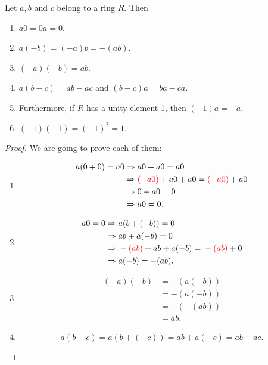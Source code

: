 \begin{theorem}
    Let $a,b$ and $c$ belong to a ring $R$. Then 
    \begin{enumerate}
        \item $a0 = 0a = 0$.
        \item $a(-b) = (-a)b = -(ab)$.
        \item $(-a)(-b) = ab$.
        \item $a(b-c) = ab - ac$ and $(b-c)a = ba-ca$.
        \item Furthermore, if $R$ has a unity element 1, then $(-1)a = -a$.
        \item $(-1)(-1) = (-1)^2 = 1$.
    \end{enumerate}
\end{theorem}
\begin{proof}
    We are going to prove each of them:

    \begin{enumerate}
        \item \begin{align*}
            a(0 + 0) = a0 &\Rightarrow a0 + a0 = a0\\
            &\Rightarrow {\color{red}{} (-a0)} + a0 + a0 = {\color{red}{} (-a0)} + a0\\
            &\Rightarrow 0 + a0 = 0\\
            &\Rightarrow a0 = 0.
        \end{align*}

        \item \begin{align*}
            a0 = 0 &\Rightarrow a(b + (-b)) = 0\\
            &\Rightarrow ab + a(-b) = 0\\
            &\Rightarrow {\color{red}{} -(ab)} + ab + a(-b) = {\color{red}{} -(ab)} + 0\\
            &\Rightarrow a(-b) = -(ab).
        \end{align*}

        \item \begin{align*}
            (-a)(-b) &= -(a(-b))\\
            &= -(a(-b))\\
            &= -(-(ab))\\
            &= ab.
        \end{align*}

        \item \[ 
            a(b-c) = a(b+(-c)) = ab + a(-c) = ab - ac.
        \]


\end{enumerate}
\end{proof}
